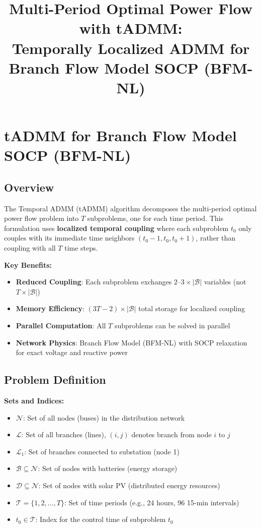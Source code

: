 \documentclass[11pt]{article}
\title{Multi-Period Optimal Power Flow with tADMM:\\Temporally Localized ADMM for Branch Flow Model SOCP (BFM-NL)}
\author{}
\date{}
\begin{document}
\maketitle

\tableofcontents
\clearpage

\section{tADMM for Branch Flow Model SOCP (BFM-NL)}

\subsection{Overview}

The Temporal ADMM (tADMM) algorithm decomposes the multi-period optimal power flow problem into $T$ subproblems, one for each time period. This formulation uses \textbf{localized temporal coupling} where each subproblem $t_0$ only couples with its immediate time neighbors $(t_0-1, t_0, t_0+1)$, rather than coupling with all $T$ time steps.

\textbf{Key Benefits:}
\begin{itemize}
    \item \textbf{Reduced Coupling}: Each subproblem exchanges $2$--$3 \times |\mathcal{B}|$ variables (not $T \times |\mathcal{B}|$)
    \item \textbf{Memory Efficiency}: $(3T-2) \times |\mathcal{B}|$ total storage for localized coupling
    \item \textbf{Parallel Computation}: All $T$ subproblems can be solved in parallel
    \item \textbf{Network Physics}: Branch Flow Model (BFM-NL) with SOCP relaxation for exact voltage and reactive power
\end{itemize}

\subsection{Problem Definition}

\textbf{Sets and Indices:}
\begin{itemize}
    \item $\mathcal{N}$: Set of all nodes (buses) in the distribution network
    \item $\mathcal{L}$: Set of all branches (lines), $(i,j)$ denotes branch from node $i$ to $j$
    \item $\mathcal{L}_1$: Set of branches connected to substation (node 1)
    \item $\mathcal{B} \subseteq \mathcal{N}$: Set of nodes with batteries (energy storage)
    \item $\mathcal{D} \subseteq \mathcal{N}$: Set of nodes with solar PV (distributed energy resources)
    \item $\mathcal{T} = \{1, 2, \ldots, T\}$: Set of time periods (e.g., 24 hours, 96 15-min intervals)
    \item $t_0 \in \mathcal{T}$: Index for the control time of subproblem $t_0$
\end{itemize}
\end{document}
